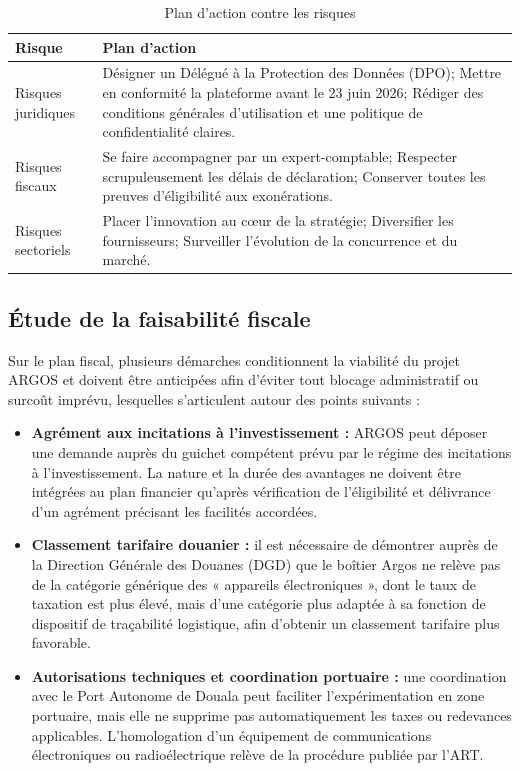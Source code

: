 \begin{table}[H]
    \centering
    \caption{Plan d'action contre les risques}
    \label{tab:plan_action_risques}
    \renewcommand{\arraystretch}{1.5}
    \begin{tabularx}{\textwidth}{|>{\raggedright\arraybackslash}p{4cm}|X|}
        \hline
        \textbf{Risque} & \textbf{Plan d'action} \\
        \hline
        Risques juridiques & Désigner un Délégué à la Protection des Données (DPO); Mettre en conformité la plateforme avant le 23 juin 2026; Rédiger des conditions générales d'utilisation et une politique de confidentialité claires. \\
        \hline
        Risques fiscaux & Se faire accompagner par un expert-comptable; Respecter scrupuleusement les délais de déclaration; Conserver toutes les preuves d'éligibilité aux exonérations. \\
        \hline
        Risques sectoriels & Placer l'innovation au cœur de la stratégie; Diversifier les fournisseurs; Surveiller l'évolution de la concurrence et du marché. \\
        \hline
    \end{tabularx}
    \tablesourcepromoteurs
\end{table}


\subsection{Étude de la faisabilité fiscale}

Sur le plan fiscal, plusieurs démarches conditionnent la viabilité du projet ARGOS et doivent être anticipées afin d'éviter tout blocage administratif ou surcoût imprévu, lesquelles s'articulent autour des points suivants :
\begin{itemize}
    \item \textbf{Agrément aux incitations à l'investissement :} ARGOS peut déposer une demande auprès du guichet compétent prévu par le régime des incitations à l'investissement. La nature et la durée des avantages ne doivent être intégrées au plan financier qu'après vérification de l'éligibilité et délivrance d'un agrément précisant les facilités accordées\cite{incitations2025}.
    \item \textbf{Classement tarifaire douanier :} il est nécessaire de démontrer auprès de la Direction Générale des Douanes (DGD) que le boîtier Argos ne relève pas de la catégorie générique des « appareils électroniques », dont le taux de taxation est plus élevé, mais d'une catégorie plus adaptée à sa fonction de dispositif de traçabilité logistique, afin d'obtenir un classement tarifaire plus favorable.
    \item \textbf{Autorisations techniques et coordination portuaire :} une coordination avec le Port Autonome de Douala peut faciliter l'expérimentation en zone portuaire, mais elle ne supprime pas automatiquement les taxes ou redevances applicables. L'homologation d'un équipement de communications électroniques ou radioélectrique relève de la procédure publiée par l'ART\cite{art_homologation}.
\end{itemize}

